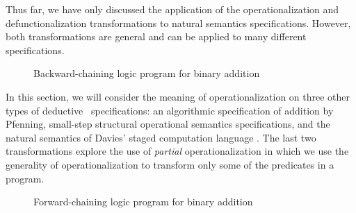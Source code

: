 Thus far, we have only discussed the application of the
operationalization and defunctionalization transformations to natural
semantics specifications. However, both transformations are general
and can be applied to many different specifications. 

\begin{figure}
\caption{Backward-chaining logic program for binary addition}
\label{fig:plus}
\end{figure}

In this section, we will consider the meaning of
operationalization on three other types of deductive
\sls~specifications: an algorithmic specification of addition by 
Pfenning, small-step structural operational semantics
specifications, and the natural semantics of Davies' staged computation
language \rowan. The last two transformations explore 
the use of {\it partial}
operationalization in which we use the generality of operationalization
to transform only some of the predicates in a program.







\begin{figure}
\caption{Forward-chaining logic program for binary addition}
\label{fig:plus-1}
\end{figure}


